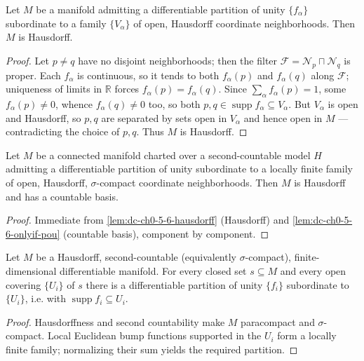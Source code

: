 \begin{lemma}
  \label{lem:dc-ch0-5-6-hausdorff}


  Let $M$ be a manifold admitting a differentiable partition of unity $\{f_\alpha\}$
  subordinate to a family $\{V_\alpha\}$ of open, Hausdorff coordinate neighborhoods. Then
  $M$ is Hausdorff.
\end{lemma}
\begin{proof}
  \sketch

  Let $p\neq q$ have no disjoint neighborhoods; then the filter $\mathcal F=\mathcal N_p
  \sqcap\mathcal N_q$ is proper. Each $f_\alpha$ is continuous, so it tends to both
  $f_\alpha(p)$ and $f_\alpha(q)$ along $\mathcal F$; uniqueness of limits in $\mathbb R$
  forces $f_\alpha(p)=f_\alpha(q)$. Since $\sum_\alpha f_\alpha(p)=1$, some $f_\alpha(p)\neq
  0$, whence $f_\alpha(q)\neq0$ too, so both $p,q\in\operatorname{supp}f_\alpha\subseteq
  V_\alpha$. But $V_\alpha$ is open and Hausdorff, so $p,q$ are separated by sets open in
  $V_\alpha$ and hence open in $M$ — contradicting the choice of $p,q$. Thus $M$ is
  Hausdorff.
\end{proof}

\begin{lemma}
  \label{lem:dc-ch0-5-6-onlyif-complete}


  Let $M$ be a connected manifold charted over a second-countable model $H$ admitting a
  differentiable partition of unity subordinate to a locally finite family of open,
  Hausdorff, $\sigma$-compact coordinate neighborhoods. Then $M$ is Hausdorff and has a
  countable basis.
\end{lemma}
\begin{proof}
  \sketch

  Immediate from \cref{lem:dc-ch0-5-6-hausdorff} (Hausdorff) and
  \cref{lem:dc-ch0-5-6-onlyif-pou} (countable basis), component by component.
\end{proof}

\begin{lemma}
  \label{lem:dc-ch0-5-6-exists}


  Let $M$ be a Hausdorff, second-countable (equivalently $\sigma$-compact),
  finite-dimensional differentiable manifold. For every closed set $s\subseteq M$
  and every open covering $\{U_i\}$ of $s$ there is a differentiable partition of
  unity $\{f_i\}$ subordinate to $\{U_i\}$, i.e. with
  $\operatorname{supp} f_i\subseteq U_i$.
\end{lemma}
\begin{proof}
  \sketch

  Hausdorffness and second countability make $M$ paracompact and $\sigma$-compact.
  Local Euclidean bump functions supported in the $U_i$ form a locally finite family;
  normalizing their sum yields the required partition.
\end{proof}

